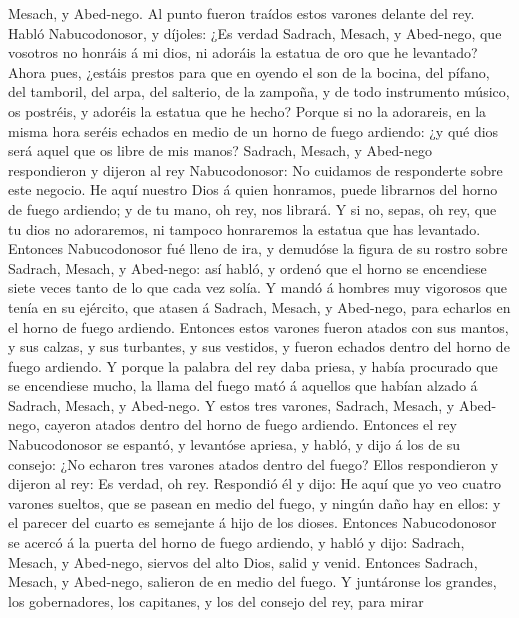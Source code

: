 Mesach, y Abed-nego. Al punto fueron traídos estos varones delante del
rey.  Habló Nabucodonosor, y díjoles: ¿Es verdad Sadrach,
Mesach, y Abed-nego, que vosotros no honráis á mi dios, ni adoráis la
estatua de oro que he levantado?  Ahora pues, ¿estáis
prestos para que en oyendo el son de la bocina, del pífano, del
tamboril, del arpa, del salterio, de la zampoña, y de todo instrumento
músico, os postréis, y adoréis la estatua que he hecho? Porque si no la
adorareis, en la misma hora seréis echados en medio de un horno de fuego
ardiendo: ¿y qué dios será aquel que os libre de mis manos?
 Sadrach, Mesach, y Abed-nego respondieron y dijeron al rey
Nabucodonosor: No cuidamos de responderte sobre este negocio.
 He aquí nuestro Dios á quien honramos, puede librarnos del
horno de fuego ardiendo; y de tu mano, oh rey, nos librará.
 Y si no, sepas, oh rey, que tu dios no adoraremos, ni
tampoco honraremos la estatua que has levantado.  Entonces
Nabucodonosor fué lleno de ira, y demudóse la figura de su rostro sobre
Sadrach, Mesach, y Abed-nego: así habló, y ordenó que el horno se
encendiese siete veces tanto de lo que cada vez solía.  Y
mandó á hombres muy vigorosos que tenía en su ejército, que atasen á
Sadrach, Mesach, y Abed-nego, para echarlos en el horno de fuego
ardiendo.  Entonces estos varones fueron atados con sus
mantos, y sus calzas, y sus turbantes, y sus vestidos, y fueron echados
dentro del horno de fuego ardiendo.  Y porque la palabra
del rey daba priesa, y había procurado que se encendiese mucho, la llama
del fuego mató á aquellos que habían alzado á Sadrach, Mesach, y
Abed-nego.  Y estos tres varones, Sadrach, Mesach, y
Abed-nego, cayeron atados dentro del horno de fuego ardiendo.
 Entonces el rey Nabucodonosor se espantó, y levantóse
apriesa, y habló, y dijo á los de su consejo: ¿No echaron tres varones
atados dentro del fuego? Ellos respondieron y dijeron al rey: Es verdad,
oh rey.  Respondió él y dijo: He aquí que yo veo cuatro
varones sueltos, que se pasean en medio del fuego, y ningún daño hay en
ellos: y el parecer del cuarto es semejante á hijo de los dioses.
 Entonces Nabucodonosor se acercó á la puerta del horno de
fuego ardiendo, y habló y dijo: Sadrach, Mesach, y Abed-nego, siervos
del alto Dios, salid y venid. Entonces Sadrach, Mesach, y Abed-nego,
salieron de en medio del fuego.  Y juntáronse los grandes,
los gobernadores, los capitanes, y los del consejo del rey, para mirar
